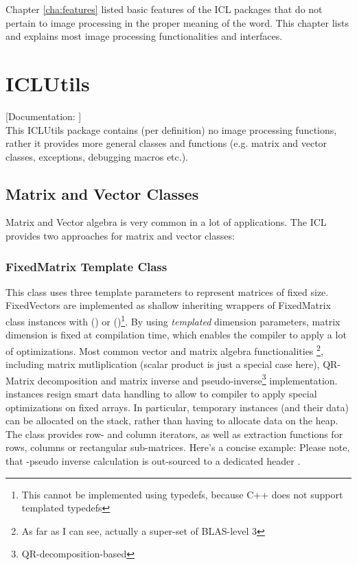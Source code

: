 Chapter \ref{cha:features} listed basic features of the ICL packages that do not pertain to image processing in the proper meaning of the word. This chapter lists and explains most image processing functionalities and interfaces.

\section{ICLUtils}

[Documentation: ]\\
This ICLUtils package contains (per definition) no image processing functions, rather it provides more general classes and functions (e.g. matrix and vector classes, exceptions, debugging macros etc.).

\subsection{Matrix and Vector Classes}
Matrix and Vector algebra is very common in a lot of applications. The ICL provides two approaches for matrix and vector classes:


\subsubsection{FixedMatrix Template Class}
This class uses three template parameters   to represent matrices of fixed size. FixedVectors are implemented as shallow inheriting wrappers of FixedMatrix class instances with  () or  ()\footnote{This cannot be implemented using typedefs, because C++ does not support templated typedefs}.
By using \emph{templated} dimension parameters, matrix dimension is fixed at compilation time, which enables the compiler to apply a lot of optimizations. Most common vector and matrix algebra functionalities \footnote{As far as I can see, actually a super-set of BLAS-level 3}, including matrix mutliplication (scalar product is just a special case here), QR-Matrix decomposition and matrix inverse and pseudo-inverse\footnote{QR-decomposition-based} implementation.  instances resign smart data handling to allow to compiler to apply special optimizations on fixed arrays. In particular, temporary instances (and their data) can be allocated on the stack, rather than having to allocate data on the heap.
The  class provides row- and column iterators, as well as extraction functions for rows, columns or rectangular sub-matrices.
Here's a concise example:
Please note, that -pseudo inverse calculation is out-sourced to a dedicated header .

